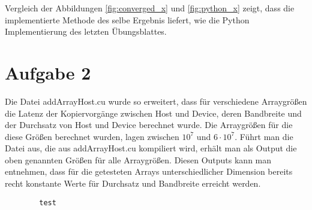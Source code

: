 \documentclass[10pt,a4paper]{article}
\begin{document}
Vergleich der Abbildungen \ref{fig:converged_x} und \ref{fig:python_x} zeigt,
dass die implementierte Methode des selbe Ergebnis liefert, wie die Python
Implementierung des letzten Übungsblattes.

\section{Aufgabe 2}
	
	Die Datei addArrayHost.cu wurde so erweitert, dass für verschiedene Arraygrößen
	die Latenz der Kopiervorgänge zwischen Host und Device, deren Bandbreite und 
	der Durchsatz von Host und Device berechnet wurde. Die Arraygrößen für die 
	diese Größen berechnet wurden, lagen zwischen $10^{7}$ und $6 \cdot 10^{7}$.
	Führt man die Datei aus, die aus addArrayHost.cu kompiliert wird, erhält man
	als Output die oben genannten Größen für alle Arraygrößen. Diesen Outputs kann
	man entnehmen, dass für die getesteten Arrays unterschiedlicher Dimension
	bereits recht konstante Werte für Durchsatz und Bandbreite erreicht werden.

	\begin{verbatim}
		test
	\end{verbatim}
\end{document}
